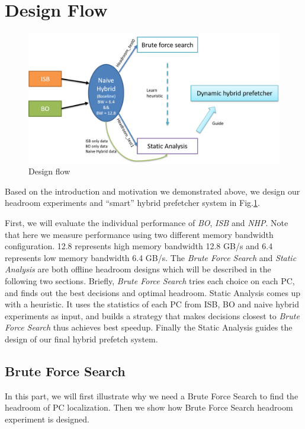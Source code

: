 \section{Design Flow}
\label{sec:designflow}

\begin{figure}[ht!]
	\centering
	\includegraphics[width=1.0\textwidth]{images/design_flow.png}
	\caption{Design flow}
	\label{fig:design_flow}
\end{figure}

Based on the introduction and motivation we demonstrated above, we design our headroom experiments and ``smart'' hybrid prefetcher system in Fig.\ref{fig:design_flow}.

First, we will evaluate the individual performance of \emph{BO}, \emph{ISB} and \emph{NHP}. Note that here we measure performance using two different memory bandwidth configuration. 12.8 represents high memory bandwidth 12.8 GB/s and 6.4 represents low memory bandwidth 6.4 GB/s. The \emph{Brute Force Search} and \emph{Static Analysis} are both offline headroom designs which will be described in the following two sections. Briefly, \emph{Brute Force Search} tries each choice on each PC, and finds out the best decisions and optimal headroom. Static Analysis comes up with a heuristic. It uses the statistics of each PC from ISB, BO and naive hybrid experiments as input, and builds a strategy that makes decisions closest to \emph{Brute Force Search} thus achieves best speedup. Finally the Static Analysis guides the design of our final hybrid prefetch system.

  \subsection{Brute Force Search}
  \label{sec:bruteforcesearch}

  In this part, we will first illustrate why we need a Brute Force Search to find the headroom of PC localization. Then we show how Brute Force Search headroom experiment is designed. \par

